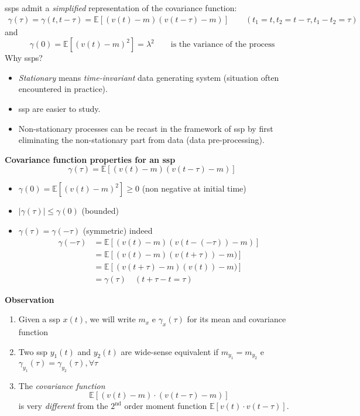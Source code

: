 \glspl{ssp} admit a \emph{simplified} representation of the covariance function:
\begin{gather*}
\gamma(\tau)=\gamma(t, t-\tau)=\mathbb{E}[(v(t)-m)(v(t-\tau)-m)]\qquad (t_{1}=t, t_{2}=t-\tau, t_{1}-t_{2}=\tau)
\end{gather*}
and
\[
	\gamma(0)=\mathbb{E}[(v(t)-m)^{2}]=\lambda^2  \qquad \text{is the variance of the process}
\]
Why \glspl{ssp}?
\begin{itemize}
	\item \emph{Stationary} means \emph{time-invariant} data generating system (situation often encountered in practice).
	\item \gls{ssp} are easier to study.
	\item Non-stationary processes can be recast in the framework of \gls{ssp} by first eliminating the non-stationary part from data (data pre-processing).
\end{itemize}

\textbf{Covariance function properties for an \gls{ssp}}
$$
\gamma(\tau)=\mathbb{E}[(v(t)-m)(v(t-\tau)-m)]
$$
\begin{itemize}
	\item $\gamma(0)=\mathbb{E}[(v(t)-m)^{2}] \geq 0$ (non negative at initial time)
	\item $|\gamma(\tau)| \leq \gamma(0)$ (bounded)
	\item $\gamma(\tau)=\gamma(-\tau)$ (symmetric) indeed
	\begin{align*}
		\gamma(-\tau)&=\mathbb{E}[(v(t)-m)(v(t-(-\tau))-m)]\\
		&=\mathbb{E}[(v(t)-m)(v(t+\tau))-m)]\\
		&=\mathbb{E}[(v(t+\tau)-m)(v(t))-m)]\\
		&=\gamma(\tau) \quad(t+\tau-t=\tau)
	\end{align*}
\end{itemize}


\textbf{Observation}
\begin{enumerate}
	\item Given a \gls{ssp} $x(t)$, we will write $m_{x}$ e $\gamma_{x}(\tau)$ for its mean and covariance function
	\item Two \gls{ssp} $y_{1}(t)$ and $y_{2}(t)$ are wide-sense equivalent if $m_{y_{1}}=m_{y_{2}}$ e $\gamma_{y_{1}}(\tau)=\gamma_{y_{2}}(\tau), \forall \tau$
	\item The \emph{covariance function}
	$$
		\mathbb{E}[(v(t)-m) \cdot(v(t-\tau)-m)]
	$$
	is very \emph{different} from the $2^{\text{nd}}$ order moment function $\mathbb{E}[v(t) \cdot v(t-\tau)]$.
\end{enumerate}

